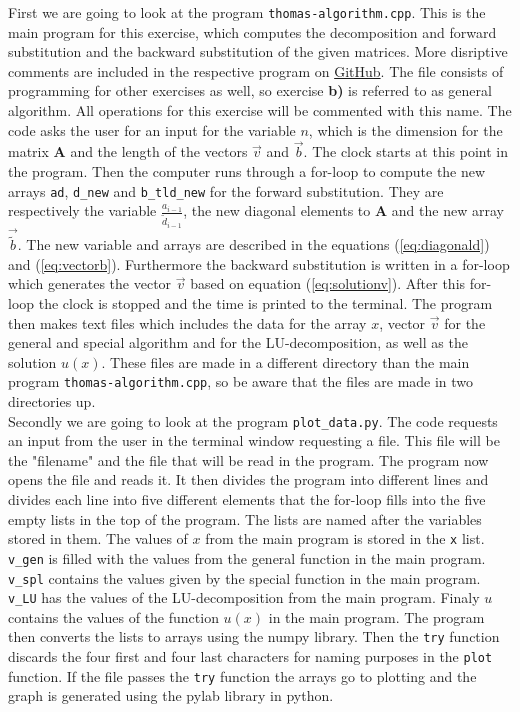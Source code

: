 \documentclass{article}
\begin{document}
    First we are going to look at the program \texttt{thomas-algorithm.cpp}. This is the main program for this exercise, which computes the decomposition and forward substitution and the backward substitution of the given matrices. More disriptive comments are included in the respective program on \href{https://github.com/Erikbgram/Fys3150}{GitHub}. The file consists of programming for other exercises as well, so exercise \textbf{b)} is referred to as general algorithm. All operations for this exercise will be commented with this name. The code asks the user for an input for the variable $n$, which is the dimension for the matrix \textbf{A} and the length of the vectors $\vec{v}$ and $\vec{b}$. The clock starts at this point in the program. Then the computer runs through a for-loop to compute the new arrays \texttt{ad}, \texttt{d\_new} and \texttt{b\_tld\_new} for the forward substitution. They are respectively the variable $\frac{a_{i-1}}{\tilde{d}_{i-1}}$, the new diagonal elements to \textbf{A}
    and the new array $\vec{\tilde{b}}$. The new variable and arrays are described in the equations (\ref{eq:diagonald}) and (\ref{eq:vectorb}). Furthermore the backward substitution is written in a for-loop which generates the vector $\vec{v}$ based on equation (\ref{eq:solutionv}). After this for-loop the clock is stopped and the time is printed to the terminal. The program then makes text files which includes the data for the array $x$, vector $\vec{v}$ for the general and special algorithm and for the LU-decomposition, as well as the solution $u(x)$. These files are made in a different directory than the main program \texttt{thomas-algorithm.cpp}, so be aware that the files are made in two directories up. \\

    Secondly we are going to look at the program \texttt{plot\_data.py}. The code requests an input from the user in the terminal window requesting a file. This file will be the "filename" and the file that will be read in the program. The program now opens the file and reads it. It then divides the program into different lines and divides each line into five different elements that the for-loop fills into the five empty lists in the top of the program. The lists are named after the variables stored in them. The values of $x$ from the main program is stored in the \texttt{x} list. \texttt{v\_gen} is filled with the values from the general function in the main program. \texttt{v\_spl} contains the values given by the special function in the main program. \texttt{v\_LU} has the values of the LU-decomposition from the main program. Finaly $u$ contains the values of the function $u(x)$ in the main program. The program then converts the lists to arrays using the numpy library. Then the \texttt{try} function discards the four first and four last characters for naming purposes in the \texttt{plot} function. If the file passes the \texttt{try} function the arrays go to plotting and the graph is generated using the pylab library in python.
\end{document}
